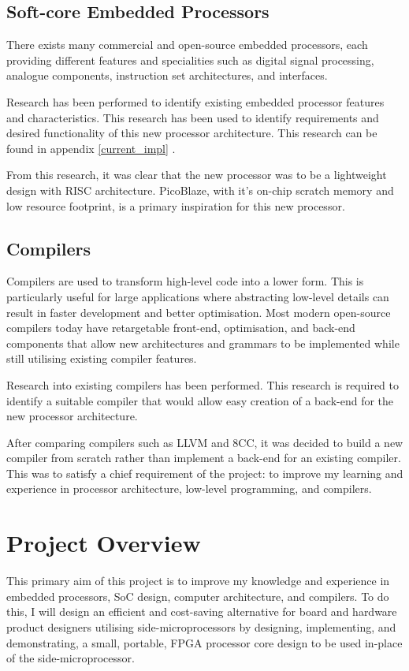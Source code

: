 \documentclass[11pt,a4paper]{report}
\begin{document}
\subsection{Soft-core Embedded Processors}
There exists many commercial and open-source embedded processors, each providing different features and specialities such as digital signal processing, analogue components, instruction set architectures, and interfaces.

Research has been performed to identify existing embedded processor features and characteristics. This research has been used to identify requirements and desired functionality of this new processor architecture. This research can be found in appendix \ref{current_impl} {}.

From this research, it was clear that the new processor was to be a lightweight design with RISC architecture. PicoBlaze, with it's on-chip scratch memory and low resource footprint, is a primary inspiration for this new processor. 

\subsection{Compilers}
Compilers are used to transform high-level code into a lower form. This is particularly useful for large applications where abstracting low-level details can result in faster development and better optimisation. Most modern open-source compilers today have retargetable front-end, optimisation, and back-end components that allow new architectures and grammars to be implemented while still utilising existing compiler features. 

Research into existing compilers has been performed. This research is required to identify a suitable compiler that would allow easy creation of a back-end for the new processor architecture. 

After comparing compilers such as LLVM and 8CC, it was decided to build a new compiler from scratch rather than implement a back-end for an existing compiler. This was to satisfy a chief requirement of the project: to improve my learning and experience in processor architecture, low-level programming, and compilers.

\newpage

\section{Project Overview}
This primary aim of this project is to improve my knowledge and experience in embedded processors, SoC design, computer architecture, and compilers. To do this, I will design an efficient and cost-saving alternative for board and hardware product designers utilising side-microprocessors by designing, implementing, and demonstrating, a small, portable, FPGA processor core design to be used in-place of the side-microprocessor. 
\end{document}
